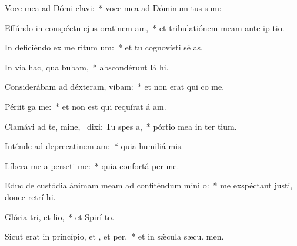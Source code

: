 \item Voce mea ad Dómi clavi:~* voce mea ad Dóminum tus sum:
\item Effúndo in conspéctu ejus oratinem am,~* et tribulatiónem meam ante ip tio.
\item In deficiéndo ex me ritum um:~* et tu cognovísti sé as.
\item In via hac, qua bubam,~* abscondérunt lá hi.
\item Considerábam ad déxteram,  vibam:~* et non erat qui co me.
\item Périit ga  me:~* et non est qui requírat á am.
\item Clamávi ad te, mine,~\pscross{} dixi: Tu  spes a,~* pórtio mea in ter tium.
\item Inténde ad deprecatinem am:~* quia humiliá  mis.
\item Líbera me a perseti me:~* quia confortá  per me.
\item Educ de custódia ánimam meam ad confiténdum mini o:~* me exspéctant justi, donec retrí hi.
\item Glória tri, et lio,~* et Spirí to.
\item Sicut erat in princípio, et , et per,~* et in sǽcula sæcu. men.
